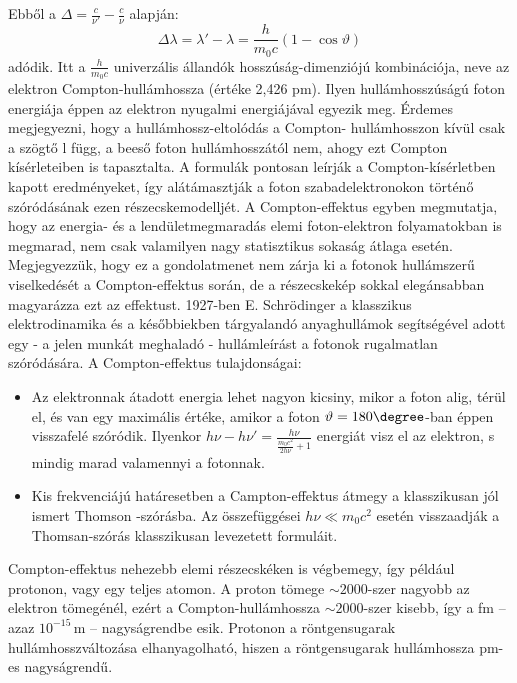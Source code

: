 \documentclass[a4paper,12pt]{article}
\begin{document}
Ebből a $\Delta = \frac{c}{\nu'} - \frac{c}{\nu}$ alapján:
\begin{equation}
    \Delta \lambda = \lambda' - \lambda = \frac{h}{m_0 c} (1 - \cos \vartheta)
\end{equation}
adódik. Itt a $\frac{h}{m_0 c}$ univerzális állandók hosszúság-dimenziójú kombinációja, neve az elektron Compton-hullámhossza (értéke 2,426 pm). 
Ilyen hullámhosszúságú foton energiája éppen az elektron nyugalmi energiájával egyezik meg. Érdemes megjegyezni, hogy a hullámhossz-eltolódás a Compton-
hullámhosszon kívül csak a szögtő l függ, a beeső foton hullámhosszától nem, ahogy ezt Compton kísérleteiben is tapasztalta.
A formulák pontosan leírják a Compton-kísérletben kapott eredményeket, így alátámasztják a foton szabadelektronokon történő szóródásának ezen részecskemodelljét.
A Compton-effektus egyben megmutatja, hogy az energia- és a lendületmegmaradás elemi foton-elektron folyamatokban is megmarad, nem csak valamilyen nagy statisztikus sokaság átlaga esetén. Megjegyezzük,
hogy ez a gondolatmenet nem zárja ki a fotonok hullámszerű viselkedését a Compton-effektus során, de a részecskekép sokkal elegánsabban magyarázza
ezt az effektust. 1927-ben E. Schrödinger a klasszikus elektrodinamika és a későbbiekben tárgyalandó anyaghullámok segítségével adott egy - a jelen munkát meghaladó - hullámleírást a fotonok rugalmatlan szóródására.
A Compton-effektus tulajdonságai:
\begin{itemize}
    \item Az elektronnak átadott energia lehet nagyon kicsiny, mikor a foton alig, térül el, és van egy maximális értéke, amikor a foton $\vartheta = 180\degree$-ban éppen visszafelé szóródik. Ilyenkor $h \nu - h \nu' = \frac{h \nu}{\frac{m_0 c^2}{2 h \nu} + 1}$ energiát visz el az elektron, s mindig marad valamennyi a fotonnak.
    \item Kis frekvenciájú határesetben a Campton-effektus átmegy a klasszikusan jól ismert Thomson -szórásba. Az összefüggései $h \nu \ll m_0 c^2$ esetén visszaadják a Thomsan-szórás klasszikusan levezetett formuláit.
\end{itemize}
Compton-effektus nehezebb elemi részecskéken is végbemegy, így például protonon, vagy egy teljes atomon. A proton tömege $\sim 2000$-szer nagyobb az elektron tömegénél, ezért a Compton-hullámhossza $\sim 2000$-szer kisebb, így a fm – azaz $10^{-15}\,\mathrm{m}$ – nagyságrendbe esik. Protonon a röntgensugarak hullámhosszváltozása elhanyagolható, hiszen a röntgensugarak hullámhossza pm-es nagyságrendű.
\end{document}
